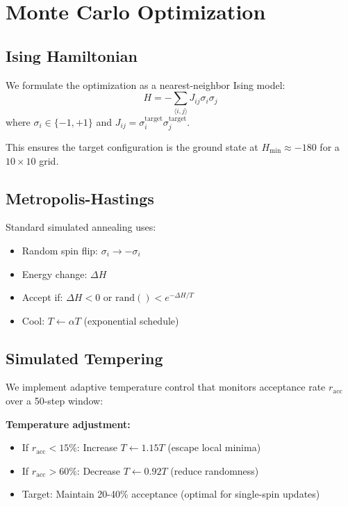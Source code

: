 \section{Monte Carlo Optimization}

\subsection{Ising Hamiltonian}

We formulate the optimization as a nearest-neighbor Ising model:
\begin{equation}
H = -\sum_{\langle i,j \rangle} J_{ij} \sigma_i \sigma_j
\end{equation}
where $\sigma_i \in \{-1, +1\}$ and $J_{ij} = \sigma_i^{\text{target}} \sigma_j^{\text{target}}$.

This ensures the target configuration is the ground state at $H_{\text{min}} \approx -180$ for a $10 \times 10$ grid.

\subsection{Metropolis-Hastings}

Standard simulated annealing uses:
\begin{itemize}
\item Random spin flip: $\sigma_i \rightarrow -\sigma_i$
\item Energy change: $\Delta H$
\item Accept if: $\Delta H < 0$ or $\text{rand}() < e^{-\Delta H/T}$
\item Cool: $T \leftarrow \alpha T$ (exponential schedule)
\end{itemize}

\subsection{Simulated Tempering}

We implement adaptive temperature control that monitors acceptance rate $r_{\text{acc}}$ over a 50-step window:

\textbf{Temperature adjustment:}
\begin{itemize}
\item If $r_{\text{acc}} < 15\%$: Increase $T \leftarrow 1.15T$ (escape local minima)
\item If $r_{\text{acc}} > 60\%$: Decrease $T \leftarrow 0.92T$ (reduce randomness)
\item Target: Maintain 20-40\% acceptance (optimal for single-spin updates)
\end{itemize}

